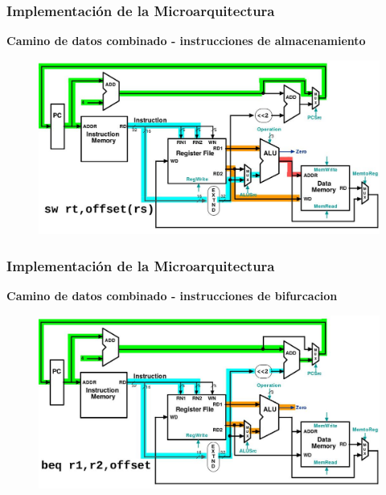 \documentclass[aspectratio=169,compress]{beamer}
\begin{document}
\begin{footnotesize}
\begin{frame}
\end{frame}



\begin{frame}
\frametitle{Implementación de la Microarquitectura}
\begin{center}\textbf{Camino de datos combinado - instrucciones de almacenamiento}\end{center}
\begin{figure}
\includegraphics[scale=0.3]{images/sw.jpg} 
\end{figure}

\end{frame}


\begin{frame}
\frametitle{Implementación de la Microarquitectura}
\begin{center}\textbf{Camino de datos combinado - instrucciones de bifurcacion}\end{center}
\begin{figure}
\includegraphics[scale=0.3]{images/beq.jpg} 
\end{figure}

\end{frame}




\end{footnotesize}
\end{document}

